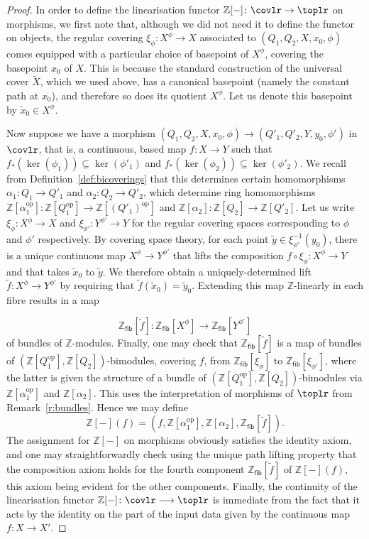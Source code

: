 \documentclass[AHL,Unicode,published]{cedram}
\newcommand{\opp}{\ensuremath{\mathrm{op}}}
\newcommand{\fib}{\ensuremath{\mathsf{fib}}}
\newcommand{\bZ}{\mathbb{Z}}
\newcommand{\too}{\ensuremath{\longrightarrow}}
\begin{document}
\begin{proof}
In order to define the linearisation functor $\bZ[-]\colon \covlr \to \toplr$ on morphisms, we first note that, although we did not need it to define the functor on objects, the regular covering $\xi_{\phi} \colon X^\phi \to X$ associated to $(Q_{1},Q_{2},X,x_{0},\phi)$ comes equipped with a particular choice of basepoint of $X^\phi$, covering the basepoint $x_{0}$ of $X$. This is because the standard construction of the universal cover $\widetilde{X}$, which we used above, has a canonical basepoint (namely the constant path at $x_{0}$), and therefore so does its quotient $X^\phi$. Let us denote this basepoint by $\widetilde{x}_{0} \in X^\phi$.

Now suppose we have a morphism $(Q_{1},Q_{2},X,x_{0},\phi) \to (Q'_{1},Q'_{2},Y,y_{0},\phi')$ in $\covlr$, that is, a continuous, based map $f \colon X \to Y$ such that $f_*(\ker(\phi_{1})) \subseteq \ker(\phi'_{1})$ and $f_*(\ker(\phi_{2})) \subseteq \ker(\phi'_{2})$. We recall from Definition~\ref{def:bicoverings} that this determines certain homomorphisms $\alpha_{1} \colon Q_{1} \to Q'_{1}$ and $\alpha_{2} \colon Q_{2} \to Q'_{2}$, which determine ring homomorphisms $\bZ[\alpha_{1}^{\opp}] \colon \bZ[Q_{1}^{\opp}] \to \bZ[(Q'_{1})^{\opp}]$ and $\bZ[\alpha_{2}] \colon \bZ[Q_{2}] \to \bZ[Q'_{2}]$. Let us write $\xi_{\phi} \colon X^\phi \rightarrow X$ and $\xi_{\phi'} \colon Y^{\phi'} \rightarrow Y$ for the regular covering spaces corresponding to $\phi$ and $\phi'$ respectively. By covering space theory, for each point $\widetilde{y} \in \xi_{\phi'}^{-1}(y_{0})$, there is a unique continuous map $X^\phi \to Y^{\phi'}$ that lifts the composition $f \circ \xi_{\phi} \colon X^\phi \to Y$ and that takes $\widetilde{x}_{0}$ to $\widetilde{y}$. We therefore obtain a uniquely-determined lift $\widetilde{f} \colon X^\phi \to Y^{\phi'}$ by requiring that $\widetilde{f}(\widetilde{x}_{0}) = \widetilde{y}_{0}$. Extending this map $\bZ$-linearly in each fibre results in a map

\[
\bZ_{\fib} [\widetilde{f}] \colon \bZ_{\fib}[X^\phi] \longrightarrow \bZ_{\fib}[Y^{\phi'}]
\]
of bundles of $\bZ$-modules. Finally, one may check that $\bZ_{\fib} [\widetilde{f}]$ is a map of bundles of $(\bZ[Q_{1}^{\opp}],\bZ[Q_{2}])$-bimodules, covering $f$, from $\bZ_{\fib}[\xi_{\phi}]$ to $\bZ_{\fib}[\xi_{\phi'}]$, where the latter is given the structure of a bundle of $(\bZ[Q_{1}^{\opp}],\bZ[Q_{2}])$-bimodules via $\bZ[\alpha_{1}^{\opp}]$ and $\bZ[\alpha_{2}]$. This uses the interpretation of morphisms of $\toplr$ from Remark~\ref{r:bundles}. Hence we may define
\[
\bZ[-](f) = \left(f,\bZ[\alpha_{1}^{\opp}],\bZ[\alpha_{2}],\bZ_{\fib}[\widetilde{f}]\right).
\]
The assignment for $\bZ[-]$ on morphisms obviously satisfies the identity axiom, and one may straightforwardly check using the unique path lifting property that the composition axiom holds for the fourth component $\bZ_{\fib}[\widetilde{f}]$ of $\bZ[-](f)$, this axiom being evident for the other components. Finally, the continuity of the linearisation functor $\bZ[-] \colon \covlr \too \toplr$ is immediate from the fact that it acts by the identity on the part of the input data given by the continuous map $f \colon X \to X'$.
\end{proof}
\end{document}
